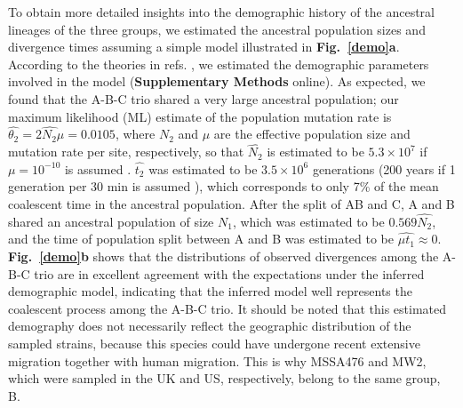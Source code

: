 \documentclass[twoside,twocolumn, letterpaper]{article}
\begin{document}
To obtain more detailed insights into the demographic history of the ancestral lineages of the three groups, we estimated the ancestral population sizes and divergence times assuming a simple model illustrated in {\bf Fig.~\ref{demo}a}. According to the theories in refs. \cite{Takahata_1995_7482371,Hudson_1983_61}, we estimated the demographic parameters involved in the model ({\bf Supplementary Methods} online). As expected, we found that the A-B-C trio shared a very large ancestral population; our maximum likelihood (ML) estimate of the population mutation rate is $\hat{\theta_2}=\hat{2N_2\mu}=0.0105$, where $N_2$ and $\mu$ are the effective population size and mutation rate per site, respectively, so that $\hat{N_2}$ is estimated to be $5.3\times 10^7$ if $\mu=10^{-10}$ is assumed \cite[]{Drake_1991_1831267}. $\hat{t_2}$ was estimated to be $3.5\times 10^6$ generations (200 years if 1 generation per 30 min is assumed \cite[]{Laurent_2001_11222560}), which corresponds to only 7\% of the mean coalescent time in the ancestral population. After the split of AB and C, A and B shared an ancestral population of size $N_1$, which was estimated to be $0.569\hat{N_{2}}$, and the time of population split between A and B was estimated to be $\hat{\mu t_{1}}\approx 0$. {\bf Fig.~\ref{demo}b} shows that the distributions of observed divergences among the A-B-C trio are in excellent agreement with the expectations under the inferred demographic model, indicating that the inferred model well represents the coalescent process among the A-B-C trio. It should be noted that this estimated demography does not necessarily reflect the geographic distribution of the sampled strains, because this species could have undergone recent extensive migration together with human migration. This is why MSSA476 and MW2, which were sampled in the UK and US\cite[]{Holden_2004_15213324}, respectively, belong to the same group, B.
\end{document}
